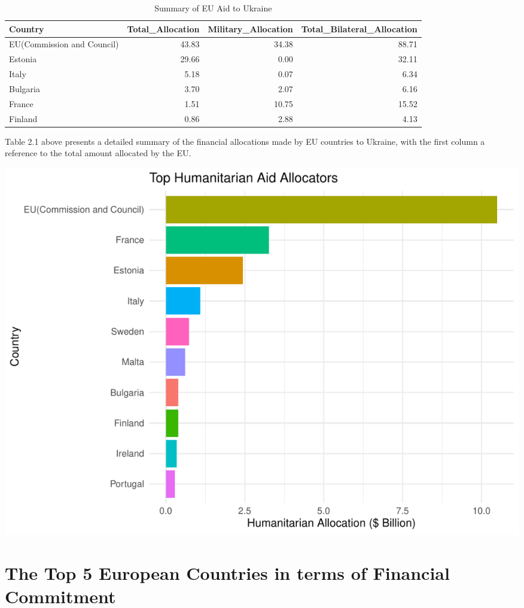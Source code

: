 \documentclass[12pt,preprint, authoryear]{elsarticle}
\let\origfigure\figure
\let\endorigfigure\endfigure
\renewenvironment{figure}[1][2] {
    \expandafter\origfigure\expandafter[H]
} {
    \endorigfigure
}
\numberwithin{equation}{section}
\numberwithin{figure}{section}
\numberwithin{table}{section}
\begin{document}
\begingroup\fontsize{12pt}{13pt}\selectfont
\begin{longtable}{lrrr}
\caption{Summary of EU Aid to Ukraine \label{tab1}} \\ 
  \toprule
Country & Total\_Allocation & Military\_Allocation & Total\_Bilateral\_Allocation \\ 
  \midrule
EU(Commission and Council) & 43.83 & 34.38 & 88.71 \\ 
  Estonia & 29.66 & 0.00 & 32.11 \\ 
  Italy & 5.18 & 0.07 & 6.34 \\ 
  Bulgaria & 3.70 & 2.07 & 6.16 \\ 
  France & 1.51 & 10.75 & 15.52 \\ 
  Finland & 0.86 & 2.88 & 4.13 \\ 
   \bottomrule
\end{longtable}
\endgroup

Table 2.1 above presents a detailed summary of the financial allocations
made by EU countries to Ukraine, with the first column a reference to
the total amount allocated by the EU.

\begin{figure}

{\centering \includegraphics{README_files/figure-latex/unnamed-chunk-1-1} 

}

\caption{Top 10 EU Countries Humanitarian Allocations to Ukraine\label{Figure1}}\label{fig:unnamed-chunk-1}
\end{figure}

\hypertarget{the-top-5-european-countries-in-terms-of-financial-commitment}{%
\section{The Top 5 European Countries in terms of Financial
Commitment}\label{the-top-5-european-countries-in-terms-of-financial-commitment}}
\end{document}
